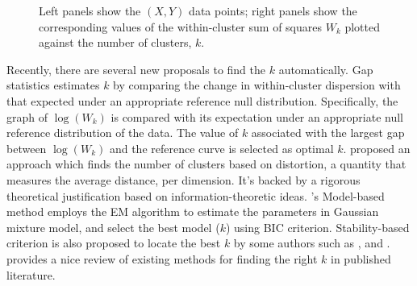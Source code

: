 \documentclass[11pt]{article}
\begin{document}
\begin{figure}
\begin{minipage}{\linewidth}
\begin{minipage}{0.45\linewidth}
  \end{minipage}
\end{minipage}
\caption{Left panels show the $(X,Y)$ data points; right panels
  show the corresponding values of the within-cluster sum of squares $W_k$
plotted against the number of clusters, $k$.}
\label{fig:elbow}
\end{figure}


Recently, there are several new proposals to find the $k$ automatically. Gap
statistics \citep{tibshirani2001estimating} estimates $k$ by comparing the
change in within-cluster dispersion with that expected under an appropriate
reference null distribution. Specifically, the graph of $\log(W_k)$ is
compared with its expectation under an appropriate null reference distribution
of the data. The value of $k$ associated with the largest gap between
$\log(W_k)$ and the reference curve is selected as optimal $k$.
\citet{sugar2003finding} proposed an approach which finds the number of
clusters based on distortion, a quantity that measures the average distance,
per dimension. It's backed by a rigorous theoretical justification based on
information-theoretic ideas.   \citet{fraley2002model}'s Model-based method
employs the EM algorithm to estimate the parameters in Gaussian mixture model,
and select the best model ($k$) using BIC criterion. Stability-based criterion
is also proposed to locate the best $k$ by some authors such as
\citet{ben2001stability}, \citet{wang2010consistent} and
\citet{fang2012selection}. \citet{chiang2010intelligent} provides a nice review
of existing methods for finding the right $k$ in published literature.
\end{document}
